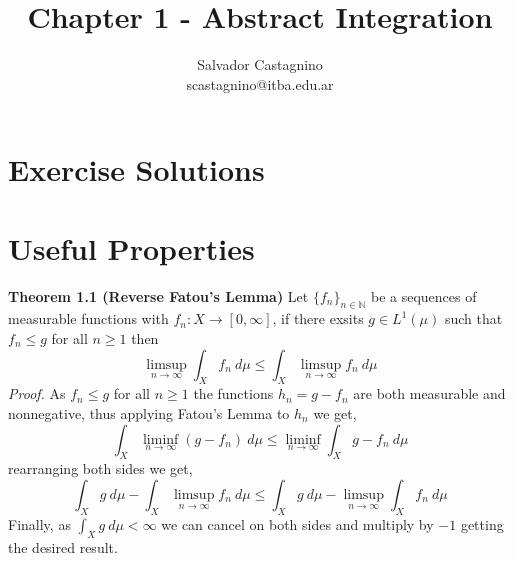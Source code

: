 \documentclass{article}
\author{Salvador Castagnino \\ scastagnino@itba.edu.ar}
\date{}
\title{Chapter 1 - Abstract Integration}
\begin{document}
\maketitle 

\section*{Exercise Solutions}

\section*{Useful Properties}

\begin{theorem}\textbf{Theorem 1.1 (Reverse Fatou's Lemma)}
    Let $\{f_n\}_{n \in \mathbb{N}}$ be a sequences of measurable functions with $f_n : X \rightarrow [0,\infty]$, if there exsits $g \in L^1 \left( \mu \right) $ such that $f_n \le g$ for all $n \ge 1$ then 
    \[
        \limsup_{n \to \infty} \int_X f_n\: d\mu \le \int_X \limsup_{n \to \infty} f_n \: d\mu 
    \]
    \textit{Proof.} As $f_n \le g$ for all $n \ge 1$ the functions $h_n = g-f_n$ are both measurable and nonnegative, thus applying Fatou's Lemma to $h_n$ we get,
    \[
        \int_X \liminf_{n \to \infty} \left( g-f_n \right) \: d\mu \le \liminf_{n \to \infty} \int_X g-f_n\: d\mu 
    \]
    rearranging both sides we get,
    \[
        \int_X g\: d\mu - \int_X \limsup_{n \to \infty} f_n\: d\mu \le \int_X g\: d\mu - \limsup_{n \to \infty} \int_X f_n\: d\mu 
    \]
    Finally, as $\int_X g\: d\mu < \infty$ we can cancel on both sides and multiply by $-1$ getting the desired result.
\end{theorem}
\end{document}
